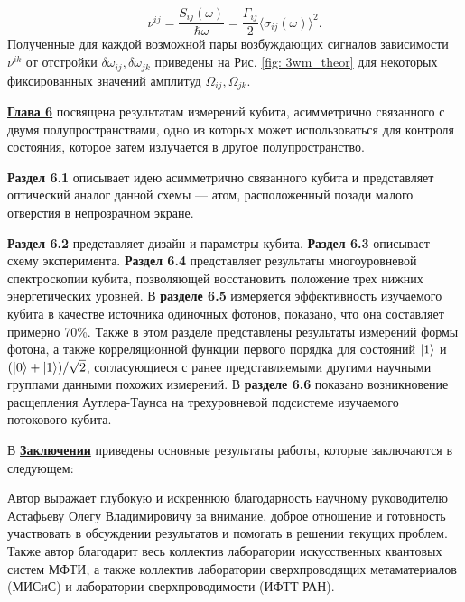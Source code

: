 \begin{equation}
\nu^{ij}=\frac{S_{ij}(\omega)}{\hbar\omega} = \frac{\Gamma_{ij}}{2}\langle\sigma_{ij}(\omega)\rangle^2.
\end{equation}
Полученные для каждой возможной пары возбуждающих сигналов зависимости $\nu^{ik}$ от отстройки $\delta\omega_{ij}, \delta\omega_{jk}$ приведены на Рис. \ref{fig: 3wm_theor} для некоторых фиксированных значений амплитуд $\Omega_{ij}, \Omega_{jk}$. 

\underline{\textbf{Глава 6}} посвящена результатам измерений кубита, асимметрично связанного с двумя полупространствами, одно из которых может использоваться для контроля состояния, которое затем излучается в другое полупространство. 

\textbf{Раздел 6.1} описывает идею асимметрично связанного кубита и представляет оптический аналог данной схемы --- атом, расположенный позади малого отверстия в непрозрачном экране.

\textbf{Раздел 6.2} представляет дизайн и параметры кубита. \textbf{Раздел 6.3} описывает схему эксперимента. \textbf{Раздел 6.4} представляет результаты многоуровневой спектроскопии кубита, позволяющей восстановить положение трех нижних энергетических уровней. В \textbf{разделе 6.5} измеряется эффективность изучаемого кубита в качестве источника одиночных фотонов, показано, что она составляет примерно 70\%. Также в этом разделе представлены результаты измерений формы фотона, а также корреляционной функции первого порядка для состояний $\ket{1}$ и $(\ket{0}+\ket{1})/\sqrt{2}$, согласующиеся с ранее представляемыми другими научными группами данными похожих измерений. В \textbf{разделе 6.6} показано возникновение расщепления Аутлера-Таунса на трехуровневой подсистеме изучаемого потокового кубита. 
%
%

В \underline{\textbf{Заключении}} приведены основные результаты работы, которые заключаются в следующем:


Автор выражает глубокую и искреннюю благодарность научному руководителю Астафьеву Олегу Владимировичу за внимание, доброе отношение и готовность участвовать в обсуждении результатов и помогать в решении текущих проблем. Также автор благодарит весь коллектив лаборатории искусственных квантовых систем МФТИ, а также коллектив лаборатории сверхпроводящих метаматериалов (МИСиС) и лаборатории сверхпроводимости (ИФТТ РАН). 

